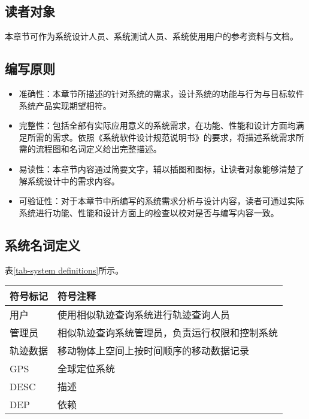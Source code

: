 \subsection{读者对象}
\label{subsec:target}
本章节可作为系统设计人员、系统测试人员、系统使用用户的参考资料与文档。

\subsection{编写原则}
\label{subsec:principle}
\begin{itemize}
	\item 准确性：本章节所描述的针对系统的需求，设计系统的功能与行为与目标软件系统产品实现期望相符。
	\item 完整性：包括全部有实际应用意义的系统需求，在功能、性能和设计方面均满足所需的需求。依照《系统软件设计规范说明书》的要求，将描述系统需求所需的流程图和名词定义给出完整描述。
	\item 易读性：本章节内容通过简要文字，辅以插图和图标，让读者对象能够清楚了解系统设计中的需求内容。
	\item 可验证性：对于本章节中所编写的系统需求分析与设计内容，读者可通过实际系统进行功能、性能和设计方面上的检查以校对是否与编写内容一致。
\end{itemize}

\subsection{系统名词定义}
\label{subsec:definitions}
表\ref{tab-system definitions}所示。
\begin{table}[!htpb]
  	\centering
		\begin{tabular}{ |p{3cm}||p{9cm}|  }
		\hline
		符号标记 & 符号注释 \\
		\hline
		用户 & 使用相似轨迹查询系统进行轨迹查询人员 \\
		\hline
		管理员 & 相似轨迹查询系统管理员，负责运行权限和控制系统 \\
		\hline
		轨迹数据 & 移动物体上空间上按时间顺序的移动数据记录 \\
		\hline
		GPS & 全球定位系统 \\
		\hline
		DESC & 描述 \\
		\hline
		DEP & 依赖 \\
		\hline
		\end{tabular}
\end{table}

